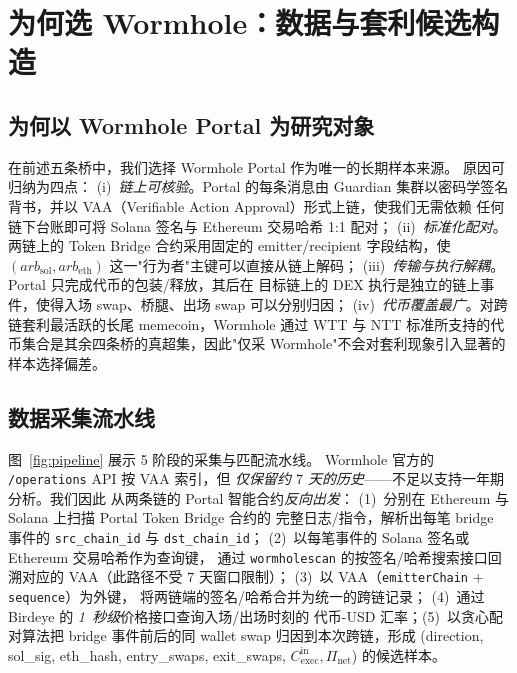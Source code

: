 \documentclass[sigconf,nonacm,10pt]{acmart}
\newcommand{\Cexec}{C_{\text{exec}}}
\newcommand{\Pnet}{\Pi_{\text{net}}}
\begin{document}
\section{为何选 Wormhole：数据与套利候选构造}
\label{sec:data}

\subsection{为何以 Wormhole Portal 为研究对象}

在前述五条桥中，我们选择 Wormhole Portal 作为唯一的长期样本来源。
原因可归纳为四点：
(i)~\emph{链上可核验}。Portal 的每条消息由 Guardian 集群以密码学签名
背书，并以 VAA（Verifiable Action Approval）形式上链，使我们无需依赖
任何链下台账即可将 Solana 签名与 Ethereum 交易哈希 1:1 配对；
(ii)~\emph{标准化配对}。两链上的 Token Bridge 合约采用固定的
emitter/recipient 字段结构，使 $(arb_{\mathrm{sol}}, arb_{\mathrm{eth}})$
这一"行为者"主键可以直接从链上解码；
(iii)~\emph{传输与执行解耦}。Portal 只完成代币的包装/释放，其后在
目标链上的 DEX 执行是独立的链上事件，使得入场 swap、桥腿、出场 swap
可以分别归因；
(iv)~\emph{代币覆盖最广}。对跨链套利最活跃的长尾 memecoin，Wormhole
通过 WTT 与 NTT 标准所支持的代币集合是其余四条桥的真超集，因此"仅采
Wormhole"不会对套利现象引入显著的样本选择偏差。

\subsection{数据采集流水线}
\label{sec:pipeline}

图~\ref{fig:pipeline} 展示 5 阶段的采集与匹配流水线。
Wormhole 官方的 \texttt{/operations} API 按 VAA 索引，但
\emph{仅保留约 $7$ 天的历史}——不足以支持一年期分析。我们因此
从两条链的 Portal 智能合约\emph{反向出发}：
(1)~分别在 Ethereum 与 Solana 上扫描 Portal Token Bridge 合约的
完整日志/指令，解析出每笔 bridge 事件的 \texttt{src\_chain\_id}
与 \texttt{dst\_chain\_id}；
(2)~以每笔事件的 Solana 签名或 Ethereum 交易哈希作为查询键，
通过 \texttt{wormholescan} 的按签名/哈希搜索接口回溯对应的
VAA（此路径不受 $7$ 天窗口限制）；
(3)~以 VAA（\texttt{emitterChain} $+$ \texttt{sequence}）为外键，
将两链端的签名/哈希合并为统一的跨链记录；
(4)~通过 Birdeye 的 \emph{1~秒级}价格接口查询入场/出场时刻的
代币-USD 汇率；(5)~以贪心配对算法把 bridge 事件前后的同 wallet
swap 归因到本次跨链，形成
(direction, sol\_sig, eth\_hash, entry\_swaps, exit\_swaps,
$\Cexec^{\text{in}}, \Pnet$) 的候选样本。
\end{document}
